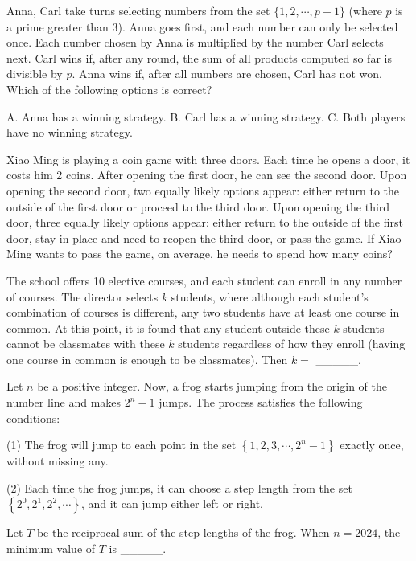 \begin{problem}\label{Combinary-21}
Anna, Carl take turns selecting numbers from the set $\{1,2, \cdots, p-1\}$ (where $p$ is a prime greater than 3). Anna goes first, and each number can only be selected once. Each number chosen by Anna is multiplied by the number Carl selects next. Carl wins if, after any round, the sum of all products computed so far is divisible by $p$. Anna wins if, after all numbers are chosen, Carl has not won. Which of the following options is correct?

A. Anna has a winning strategy.
B. Carl has a winning strategy.
C. Both players have no winning strategy.
\end{problem}



\begin{problem}\label{Combinary-23}
Xiao Ming is playing a coin game with three doors. Each time he opens a door, it costs him 2 coins. After opening the first door, he can see the second door. Upon opening the second door, two equally likely options appear: either return to the outside of the first door or proceed to the third door. Upon opening the third door, three equally likely options appear: either return to the outside of the first door, stay in place and need to reopen the third door, or pass the game. If Xiao Ming wants to pass the game, on average, he needs to spend how many coins? 
\end{problem}


\begin{problem}\label{Combinary-24}
The school offers 10 elective courses, and each student can enroll in any number of courses. The director selects $k$ students, where although each student's combination of courses is different, any two students have at least one course in common. At this point, it is found that any student outside these $k$ students cannot be classmates with these $k$ students regardless of how they enroll (having one course in common is enough to be classmates). Then $k=$ \_\_\_\_\_.
\end{problem}

\begin{problem}\label{Combinary-25}
 Let $n$ be a positive integer. Now, a frog starts jumping from the origin of the number line and makes $2^{n}-1$ jumps. The process satisfies the following conditions:

(1) The frog will jump to each point in the set $\left\{1,2,3, \cdots, 2^{n}-1\right\}$ exactly once, without missing any.

(2) Each time the frog jumps, it can choose a step length from the set $\left\{2^{0}, 2^{1}, 2^{2}, \cdots\right\}$, and it can jump either left or right.

Let $T$ be the reciprocal sum of the step lengths of the frog. When $n=2024$, the minimum value of $T$ is \_\_\_\_\_.
\end{problem}

